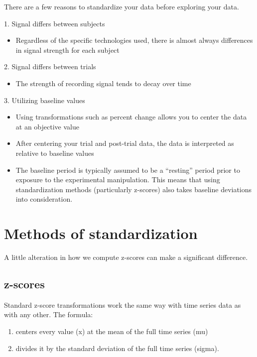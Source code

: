 \documentclass[
]{book}
\providecommand{\tightlist}{%
  \setlength{\itemsep}{0pt}\setlength{\parskip}{0pt}}
\begin{document}
There are a few reasons to standardize your data before exploring your data.

1. Signal differs between subjects

\begin{itemize}
\tightlist
\item
  Regardless of the specific technologies used, there is almost always differences in signal strength for each subject
\end{itemize}

2. Signal differs between trials

\begin{itemize}
\tightlist
\item
  The strength of recording signal tends to decay over time
\end{itemize}

3. Utilizing baseline values

\begin{itemize}
\tightlist
\item
  Using transformations such as percent change allows you to center the data at an objective value
\item
  After centering your trial and post-trial data, the data is interpreted as relative to baseline values
\item
  The baseline period is typically assumed to be a ``resting'' period prior to exposure to the experimental manipulation. This means that using standardization methods (particularly z-scores) also takes baseline deviations into consideration.
\end{itemize}

\hypertarget{stand-methods}{%
\section{Methods of standardization}\label{stand-methods}}

A little alteration in how we compute z-scores can make a significant difference.

\hypertarget{stand-methods-zscore}{%
\subsection{z-scores}\label{stand-methods-zscore}}

Standard z-score transformations work the same way with time series data as with any other. The formula:

\begin{enumerate}
\def\labelenumi{\arabic{enumi}.}
\tightlist
\item
  centers every value (x) at the mean of the full time series (mu)
\item
  divides it by the standard deviation of the full time series (sigma).
\end{enumerate}
\end{document}

